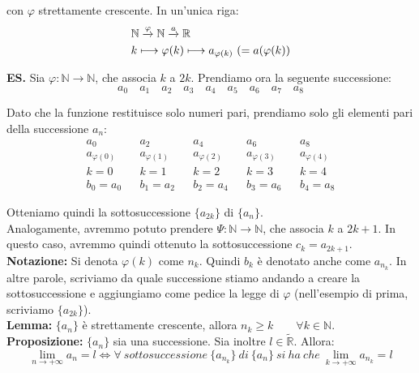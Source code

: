 \documentclass{article}
\begin{document}
\noindent con $\varphi$ strettamente crescente. In un'unica riga:
\begin{align*}
    & \mathbb{N} \overset{\varphi}{\xrightarrow{}} \mathbb{N} \xrightarrow{\mathrlap{a}\ } \mathbb{R} \\
    & k \longmapsto  \varphi(k) \longmapsto a_{\varphi(k)} \ (= a(\varphi(k))
\end{align*}

\noindent\textbf{ES.} Sia $\varphi: \mathbb{N} \xrightarrow{} \mathbb{N}$, che associa $k$ a $2k$. Prendiamo ora la seguente successione:
\begin{equation*}
    a_0 \quad a_1 \quad a_2 \quad a_3 \quad a_4 \quad a_5 \quad a_6 \quad a_7 \quad a_8
\end{equation*}

\noindent Dato che la funzione restituisce solo numeri pari, prendiamo solo gli elementi pari della successione $a_n$:
\begin{align*}
    & a_0 && a_2 && a_4 && a_6 && a_8 & \\
    & a_{\varphi(0)} && a_{\varphi(1)} && a_{\varphi(2)} && a_{\varphi(3)} && a_{\varphi(4)} \\
    & k = 0 && k = 1 && k = 2 && k = 3 && k = 4 \\
    & b_0 = a_0  && b_1 = a_2 && b_2 = a_4 && b_3 = a_6 && b_4 = a_8
\end{align*}

\noindent Otteniamo quindi la sottosuccessione $\{a_{2k}\}$ di $\{a_n\}$.\\

\noindent Analogamente, avremmo potuto prendere $\Psi: \mathbb{N} \xrightarrow{} \mathbb{N}$, che associa $k$ a $2k + 1$. In questo caso, avremmo quindi ottenuto la sottosuccessione $c_k = a_{2k + 1}$.\\

\noindent\textbf{Notazione:} Si denota $\varphi(k)$ come $n_k$. Quindi $b_k$ è denotato anche come $a_{n_k}$. In altre parole, scriviamo da quale successione stiamo andando a creare la sottosuccessione e aggiungiamo come pedice la legge di $\varphi$ (nell'esempio di prima, scriviamo $\{a_{2k}\}$).\\

\noindent\textbf{Lemma:} $\{a_n\}$ è strettamente crescente, allora $n_k \geq k \qquad \forall k \in \mathbb{N}$.\\

\noindent\textbf{Proposizione:} $\{a_n\}$ sia una successione. Sia inoltre $l \in \widetilde{\mathbb{R}}$. Allora:
\begin{equation*}
    \lim_{n \to +\infty} a_n = l \iff \forall \ sottosuccessione \ \{a_{n_k}\} \ di \ \{a_n\} \ si \ ha \ che \ \lim_{k \to +\infty} a_{n_k} = l
\end{equation*}
\end{document}
